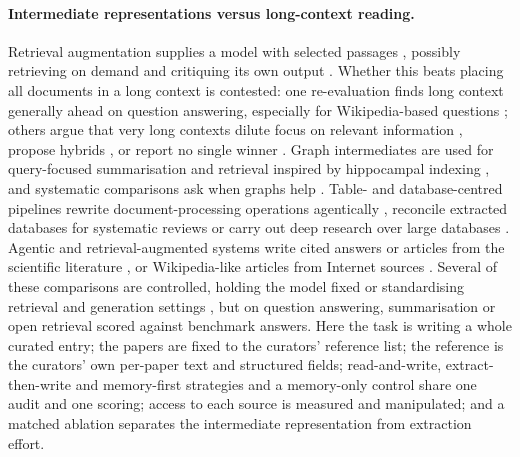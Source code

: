 \documentclass{article} %
\begin{document}
\paragraph{Intermediate representations versus long-context reading.}
Retrieval augmentation supplies a model with selected passages \citep{Lewis2020RetrievalaugmentedGeneration}, possibly retrieving on demand and critiquing its own output \citep{Asai2023SelfragLearning}. Whether this beats placing all documents in a long context is contested: one re-evaluation finds long context generally ahead on question answering, especially for Wikipedia-based questions \citep{Li2024LongContext}; others argue that very long contexts dilute focus on relevant information \citep{Yu2024DefenseRag}, propose hybrids \citep{li2024retrieval}, or report no single winner \citep{Li2025LaraBenchmarking}. Graph intermediates are used for query-focused summarisation \citep{edge2024local} and retrieval inspired by hippocampal indexing \citep{Gutirrez2024HipporagNeurobiologically}, and systematic comparisons ask when graphs help \citep{han2025rag,xiang2025use}. Table- and database-centred pipelines rewrite document-processing operations agentically \citep{shankar2025docetl}, reconcile extracted databases for systematic reviews \citep{joshi2026sliders} or carry out deep research over large databases \citep{liu2026datastorm}. Agentic and retrieval-augmented systems write cited answers or articles from the scientific literature \citep{Lla2023PaperqaRetrievalaugmented,Asai2024OpenscholarSynthesizing,singh2025ai2,skarlinski2024language}, or Wikipedia-like articles from Internet sources \citep{shao2024assisting}. Several of these comparisons are controlled, holding the model fixed or standardising retrieval and generation settings \citep{li2024retrieval,Li2025LaraBenchmarking,han2025rag}, but on question answering, summarisation or open retrieval scored against benchmark answers. Here the task is writing a whole curated entry; the papers are fixed to the curators' reference list; the reference is the curators' own per-paper text and structured fields; read-and-write, extract-then-write and memory-first strategies and a memory-only control share one audit and one scoring; access to each source is measured and manipulated; and a matched ablation separates the intermediate representation from extraction effort.
\end{document}
